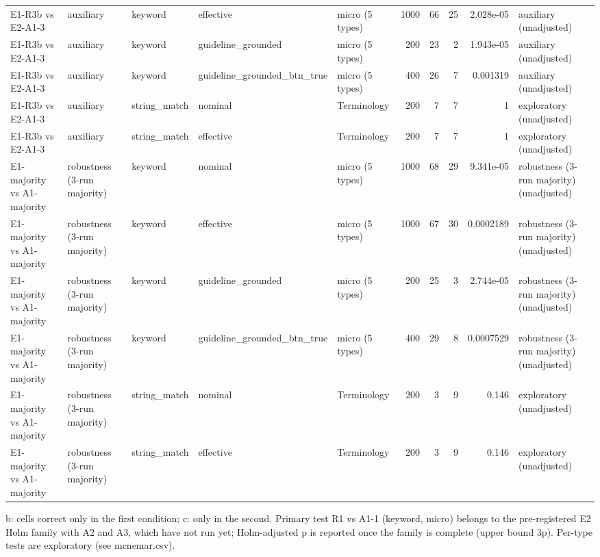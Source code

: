 \begin{table}[t]
\begin{tabular}{lllllrrrrl}
E1-R3b vs E2-A1-3 & auxiliary & keyword & effective & micro (5 types) & 1000 & 66 & 25 & 2.028e-05 & auxiliary (unadjusted) \\
E1-R3b vs E2-A1-3 & auxiliary & keyword & guideline\_grounded & micro (5 types) & 200 & 23 & 2 & 1.943e-05 & auxiliary (unadjusted) \\
E1-R3b vs E2-A1-3 & auxiliary & keyword & guideline\_grounded\_btn\_true & micro (5 types) & 400 & 26 & 7 & 0.001319 & auxiliary (unadjusted) \\
E1-R3b vs E2-A1-3 & auxiliary & string\_match & nominal & Terminology & 200 & 7 & 7 & 1 & exploratory (unadjusted) \\
E1-R3b vs E2-A1-3 & auxiliary & string\_match & effective & Terminology & 200 & 7 & 7 & 1 & exploratory (unadjusted) \\
E1-majority vs A1-majority & robustness (3-run majority) & keyword & nominal & micro (5 types) & 1000 & 68 & 29 & 9.341e-05 & robustness (3-run majority) (unadjusted) \\
E1-majority vs A1-majority & robustness (3-run majority) & keyword & effective & micro (5 types) & 1000 & 67 & 30 & 0.0002189 & robustness (3-run majority) (unadjusted) \\
E1-majority vs A1-majority & robustness (3-run majority) & keyword & guideline\_grounded & micro (5 types) & 200 & 25 & 3 & 2.744e-05 & robustness (3-run majority) (unadjusted) \\
E1-majority vs A1-majority & robustness (3-run majority) & keyword & guideline\_grounded\_btn\_true & micro (5 types) & 400 & 29 & 8 & 0.0007529 & robustness (3-run majority) (unadjusted) \\
E1-majority vs A1-majority & robustness (3-run majority) & string\_match & nominal & Terminology & 200 & 3 & 9 & 0.146 & exploratory (unadjusted) \\
E1-majority vs A1-majority & robustness (3-run majority) & string\_match & effective & Terminology & 200 & 3 & 9 & 0.146 & exploratory (unadjusted) \\
\bottomrule
\end{tabular}
\par\footnotesize b: cells correct only in the first condition; c: only in the second. Primary test R1 vs A1-1 (keyword, micro) belongs to the pre-registered E2 Holm family with A2 and A3, which have not run yet; Holm-adjusted p is reported once the family is complete (upper bound 3p). Per-type tests are exploratory (see mcnemar.csv).
\end{table}
